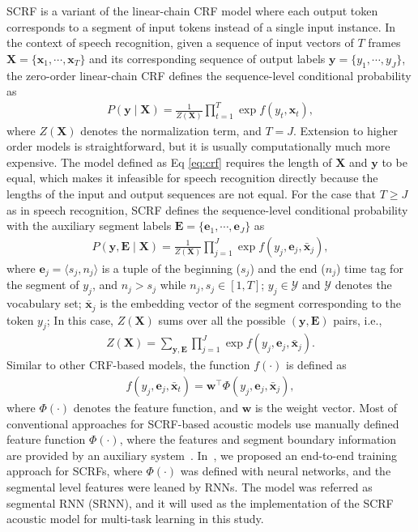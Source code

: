 \documentclass[a4paper]{article}
\begin{document}
SCRF is a variant of the linear-chain CRF model where each output token corresponds to a segment of input tokens instead of a single input instance. In the context of speech recognition, given a sequence of input vectors of $T$ frames ${\bm X} = \{{\bm x}_1, \cdots, {\bm x}_T\}$ and its corresponding sequence of output labels ${\bm y} = \{y_1, \cdots, y_J\}$, the zero-order linear-chain CRF defines the sequence-level conditional probability as
\begin{align}
\label{eq:crf}
P({\bm y} \mid {\bm X}) = \frac{1}{Z({\bm X})} \prod_{t=1}^T \exp f \left( y_t, {\bm x}_t \right),
\end{align}
where $Z({\bm X})$ denotes the normalization term, and $T=J$. Extension to higher order models is straightforward, but it is usually computationally much more expensive. The model defined as Eq \eqref{eq:crf} requires the length of ${\bm X}$ and ${\bm y}$ to be equal, which makes it infeasible for speech recognition directly because the lengths of the input and output sequences are not equal. For the case that $T\ge J$ as in speech recognition, SCRF defines the sequence-level conditional probability with the auxiliary segment labels ${\bm E} = \{{\bm e}_1, \cdots, {\bm e}_J\}$ as
\begin{align}
\label{eq:scrf}
P({\bm y}, {\bm E} \mid {\bm X}) = \frac{1}{Z({\bm X})} \prod_{j=1}^J \exp f \left( y_j, {\bm e}_j, \bar{\bm x}_j \right),
\end{align}
where $\mathbf{e}_j = \langle s_{j}, n_{j} \rangle$ is a tuple of the beginning ($s_{j}$) and the end ($n_{j}$) time tag for the segment of $y_j$, and $n_j > s_j $ while $n_j, s_j \in [1, T]$; $y_j \in \mathcal{Y}$ and $\mathcal{Y}$ denotes the vocabulary set; $\bar{\bm x}_j$ is the embedding vector of the segment corresponding to the token $y_j$; In this case, $Z({\bm X})$ sums over all the possible $({\bm y, \bm E})$ pairs, i.e.,
\begin{eqnarray}
Z({\bm X}) = \sum_{\bm y,\bm E} \prod_{j=1}^J \exp f \left( y_j, {\bm e}_j, \bar{\bm x}_j \right).
\end{eqnarray}
Similar to other CRF-based models, the function $f(\cdot)$ is defined as
\begin{eqnarray}
\label{eq:phi}
f \left( y_j, {\bm e}_j, \bar{\bm x}_t \right) = \mathbf{w}^\top \Phi (y_j, {\bm e}_j, \bar{\bm x}_j),
\end{eqnarray}
where $\Phi(\cdot)$ denotes the feature function, and $\mathbf{w}$ is the weight vector. Most of conventional approaches for SCRF-based acoustic models use manually defined feature function $\Phi(\cdot)$, where the features and segment boundary information are provided by an auxiliary system~\cite{zweig2011speech, fosler2013conditional}. In~\cite{kong2015segmental, lu2016segmental}, we proposed an end-to-end training approach for SCRFs, where $\Phi(\cdot)$ was defined with neural networks, and the segmental level features were leaned by RNNs. The model was referred as segmental RNN (SRNN), and it will used as the implementation of the SCRF acoustic model for multi-task learning in this study. 
\end{document}
